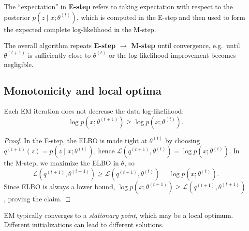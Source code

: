\documentclass[../main]{subfiles}
\begin{document}
\begin{remark}
    The ``expectation'' in \textbf{E-step} refers to taking expectation with
    respect to the posterior $p(z\mid x;\theta^{(t)})$, which is computed in the
    E-step and then used to form the expected complete log-likelihood in the
    M-step.
\end{remark}

\begin{note}
    The overall algorithm repeats \textbf{E-step $\rightarrow$ M-step} until
    convergence, e.g.\ until $\theta^{(t+1)}$ is sufficiently close to
    $\theta^{(t)}$ or the log-likelihood improvement becomes negligible.
\end{note}

\subsection{Monotonicity and local optima}
\begin{proposition}
    Each EM iteration does not decrease the data log-likelihood:
    \[
        \log p(x;\theta^{(t+1)}) \ge \log p(x;\theta^{(t)}).
    \]
\end{proposition}
\begin{proof}
    In the E-step, the ELBO is made tight at $\theta^{(t)}$ by choosing
    $q^{(t+1)}(z)=p(z\mid x;\theta^{(t)})$, hence
    $\mathcal L(q^{(t+1)},\theta^{(t)})=\log p(x;\theta^{(t)})$.
    In the M-step, we maximize the ELBO in $\theta$, so
    \[
        \mathcal L(q^{(t+1)},\theta^{(t+1)})
        \ge
        \mathcal L(q^{(t+1)},\theta^{(t)})
        =
        \log p(x;\theta^{(t)}).
    \]
    Since ELBO is always a lower bound, $\log p(x;\theta^{(t+1)})\ge
    \mathcal L(q^{(t+1)},\theta^{(t+1)})$, proving the claim.
\end{proof}

\begin{remark}
    EM typically converges to a \emph{stationary point}, which may be a local
    optimum. Different initializations can lead to different solutions.
\end{remark}

\end{document}

